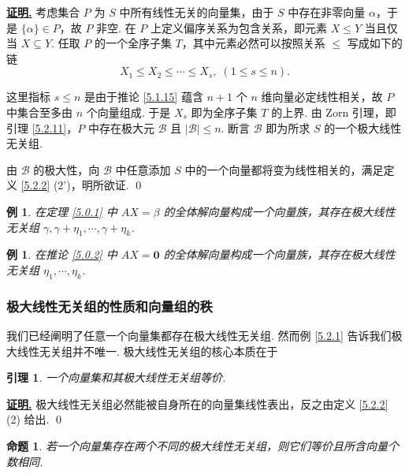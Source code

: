 \documentclass[10pt,openany]{article}
\theoremstyle{thmstyle} %
\theoremstyle{defstyle} %
\newtheorem{lemma}[theorem]{引理}
\theoremstyle{prostyle} %
\newtheorem{proposition}[theorem]{命题}
\theoremstyle{exastyle}
\newtheorem{example}[theorem]{例}
\theoremstyle{remstyle}
\renewenvironment{proof}[1][证明]{\par\underline{\textbf{#1.}} \;\fangsong}{\qed\par}
\begin{document}
\begin{proof}
	考虑集合 \( P \) 为 \( S \) 中所有线性无关的向量集，由于 \( S \) 中存在非零向量 \( \alpha \)，于是 \( \{\alpha\} \in P \)，故 \( P \) 非空. 在 \( P \) 上定义偏序关系为包含关系，即元素 \( X \leq Y \) 当且仅当 \( X \subseteq Y \). 任取 \( P \) 的一个全序子集 \( T \)，其中元素必然可以按照关系 \( \leq \) 写成如下的链
	\[ X_1 \leq X_2 \leq \cdots \leq X_s, \; (1 \leq s \leq n). \]
	
	这里指标 \( s \leq n \) 是由于推论 \ref{5.1.15} 蕴含 \( n+1 \) 个 \( n \) 维向量必定线性相关，故 \( P \) 中集合至多由 \( n \) 个向量组成. 于是 \( X_s \) 即为全序子集 \( T \) 的上界. 由 Zorn 引理，即引理 \ref{5.2.11}，\( P \) 中存在极大元 \( \mathcal{B} \) 且 \( |\mathcal{B}| \leq n \). 断言 \( \mathcal{B} \) 即为所求 \( S \) 的一个极大线性无关组.
	
	由 \( \mathcal{B} \) 的极大性，向 \( \mathcal{B} \) 中任意添加 \( S \) 中的一个向量都将变为线性相关的，满足定义 \ref{5.2.2} (2')，明所欲证.
\end{proof}

\begin{example}
	在定理 \ref{5.0.1} 中 \( AX=\beta \) 的全体解向量构成一个向量族，其存在极大线性无关组 \( \gamma, \gamma+\eta_1,\cdots,\gamma+\eta_k \).
\end{example}


\begin{example} 
	在推论 \ref{5.0.2} 中 \( AX=\bm{0} \) 的全体解向量构成一个向量族，其存在极大线性无关组 \( \eta_1,\cdots,\eta_k \).
\end{example}


\subsubsection{极大线性无关组的性质和向量组的秩}


我们已经阐明了任意一个向量集都存在极大线性无关组. 然而例 \ref{5.2.1} 告诉我们极大线性无关组并不唯一. 极大线性无关组的核心本质在于

\begin{lemma} \label{5.2.15}
	一个向量集和其极大线性无关组等价.
\end{lemma}

\begin{proof}
	极大线性无关组必然能被自身所在的向量集线性表出，反之由定义 \ref{5.2.2} (2) 给出.
\end{proof}

\begin{proposition} \label{5.2.16}
	若一个向量集存在两个不同的极大线性无关组，则它们等价且所含向量个数相同.
\end{proposition}
\end{document}

